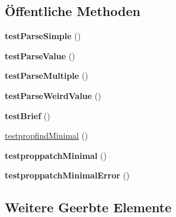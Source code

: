 \subsection*{Öffentliche Methoden}
\begin{DoxyCompactItemize}
\item 
\mbox{\label{class_sabre_1_1_d_a_v_1_1_h_t_t_p_prefer_parsing_test_afb9c568b2917197cec1c046f11841c76}} 
{\bfseries test\+Parse\+Simple} ()
\item 
\mbox{\label{class_sabre_1_1_d_a_v_1_1_h_t_t_p_prefer_parsing_test_a2e0588fa572b79a8d21954a650495d67}} 
{\bfseries test\+Parse\+Value} ()
\item 
\mbox{\label{class_sabre_1_1_d_a_v_1_1_h_t_t_p_prefer_parsing_test_a42579687ea2e2579a21f160d696c074d}} 
{\bfseries test\+Parse\+Multiple} ()
\item 
\mbox{\label{class_sabre_1_1_d_a_v_1_1_h_t_t_p_prefer_parsing_test_ac367a6d275d4e372277dc48d661dad01}} 
{\bfseries test\+Parse\+Weird\+Value} ()
\item 
\mbox{\label{class_sabre_1_1_d_a_v_1_1_h_t_t_p_prefer_parsing_test_ad2fea21ef9c576b6fb6681309f7fbf58}} 
{\bfseries test\+Brief} ()
\item 
\mbox{\hyperlink{class_sabre_1_1_d_a_v_1_1_h_t_t_p_prefer_parsing_test_add84489c4d6ed3d4aa6add8261487d8c}{testpropfind\+Minimal}} ()
\item 
\mbox{\label{class_sabre_1_1_d_a_v_1_1_h_t_t_p_prefer_parsing_test_aa3c53d2dfe2357a8db303f01b53d9de4}} 
{\bfseries testproppatch\+Minimal} ()
\item 
\mbox{\label{class_sabre_1_1_d_a_v_1_1_h_t_t_p_prefer_parsing_test_a7f3f1bb71d726edc6a724085f5b3dd03}} 
{\bfseries testproppatch\+Minimal\+Error} ()
\end{DoxyCompactItemize}
\subsection*{Weitere Geerbte Elemente}


